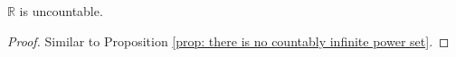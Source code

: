 \begin{proposition}
    $\mathbb R$ is uncountable.
    
	\begin{proof}
		Similar to Proposition \ref{prop: there is no  countably infinite power set}.
	\end{proof}
\end{proposition}












































%